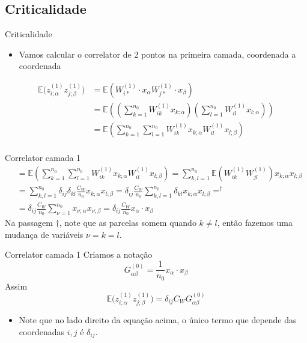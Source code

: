 \documentclass{beamer}
\newcommand{\EE}{\mathbb{E}}
\newcommand{\aaA}{\alpha}
\newcommand{\aaB}{\beta}
\begin{document}
\subsection{Criticalidade}
\begin{frame}{Criticalidade}
	\begin{itemize}
		\item Vamos calcular o correlator de 2 pontos na primeira camada, coordenada a coordenada
	\end{itemize}
		\begin{align*}
			\EE\big(z^{(1)}_{i;\aaA} z^{(1)}_{j;\aaB}\big) &= \EE\left(W^{(1)}_{i*}\cdot x_{\aaA}W^{(1)}_{j*}\cdot x_{\aaB} \right)\\
		&= \EE\left( \left(\sum_{k=1}^{n_0} W^{(1)}_{ik}x_{k;\aaA}\right)
		\left(\sum_{l=1}^{n_0} W^{(1)}_{il}x_{l;\aaA}\right) \right)\\
		&= \EE\left(\sum_{k=1}^{n_0}\sum_{l=1}^{n_0}W^{(1)}_{ik}x_{k;\aaA}W^{(1)}_{il}x_{l;\aaB} \right) \\
		\end{align*}
	 
\end{frame}
\begin{frame}{Correlator camada 1}
	\begin{align*}
		&=\EE\left(\sum_{k=1}^{n_0}\sum_{l=1}^{n_0}W^{(1)}_{ik}x_{k;\aaA}W^{(1)}_{il}x_{l;\aaB} \right) = \sum_{k,l=1}^{n_0} \EE\left(W^{(1)}_{ik}W^{(1)}_{jl}\right) x_{k;\aaA}x_{l;\aaB} \\
		&= \sum_{k,l=1}^{n_0} \delta_{ij}\delta_{kl}\frac{C_W}{n_0} x_{k;\aaA}x_{l;\aaB} =\delta_{ij}\frac{C_W}{n_0} \sum_{k,l=1}^{n_0}\delta_{kl}x_{k;\aaA}x_{l;\aaB} =  ^{\dagger}\\
		&= \delta_{ij}\frac{C_W}{n_0} \sum_{\nu=1}^{n_0} x_{\nu;\aaA}x_{\nu;\aaB} =  \delta_{ij}\frac{C_W}{n_0}  x_{\aaA} \cdot x_{\aaB} \tag{3.8}
	\end{align*}
	Na passagem $\dagger$, note que as parcelas somem quando $k\neq l$, então fazemos uma mudança de variáveis $\nu = k = l$.
\end{frame}

\begin{frame}{Correlator camada 1}
	Criamos a notação 
	\begin{equation*}\tag{3.9}
		G_{\aaA\aaB}^{(0)} = \frac{1}{n_0} x_{\aaA}\cdot x_{\aaB}
	\end{equation*}
	Assim 
	\begin{equation*}\tag{3.10}
		\EE\big(z^{(1)}_{i;\aaA} z^{(1)}_{j;\aaB}\big) = \delta_{ij}C_WG_{\aaA\aaB}^{(0)}
	\end{equation*}
	\begin{itemize}
		\item Note que no lado direito da equação acima, o único termo que depende das coordenadas $i,j$ é $\delta_{ij}$.
\end{itemize}
\end{frame}
\end{document}
